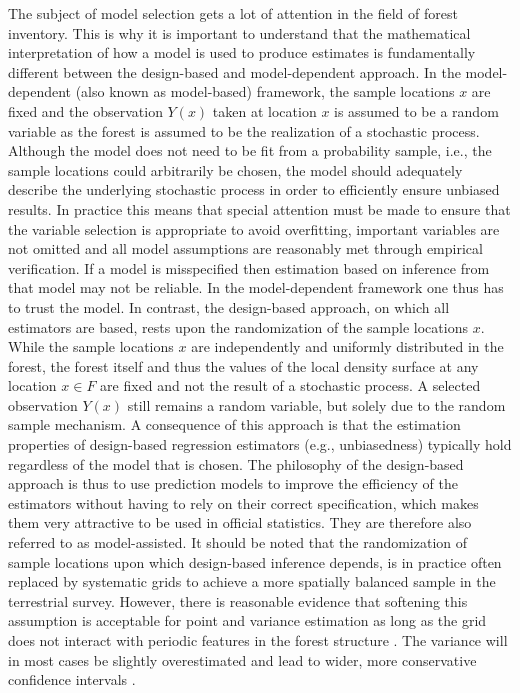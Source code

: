 \documentclass[article]{jss}
\begin{document}
The subject of model selection gets a lot of attention in the field of forest inventory. This is why it is important to understand that the mathematical interpretation of how a model is used to produce estimates is fundamentally different between the design-based and model-dependent approach. In the model-dependent (also known as model-based) framework, the sample locations $x$ are fixed and the observation $Y(x)$ taken at location $x$ is assumed to be a random variable as the forest is assumed to be the realization of a stochastic process. Although the model does not need to be fit from a probability sample, i.e., the sample locations could arbitrarily be chosen, the model should adequately describe the underlying stochastic process in order to efficiently ensure unbiased results. In practice this means that special attention must be made to ensure that the variable selection is appropriate to avoid overfitting, important variables are not omitted and all model assumptions are reasonably met through empirical verification. If a model is misspecified then estimation based on inference from that model may not be reliable. In the model-dependent framework one thus has to trust the model. In contrast, the design-based approach, on which all  estimators are based, rests upon the randomization of the sample locations $x$. While the sample locations $x$ are independently and uniformly distributed in the forest, the forest itself and thus the values of the local density surface at any location $x \in F$ are fixed and not the result of a stochastic process. A selected observation $Y(x)$ still remains a random variable, but solely due to the random sample mechanism. A consequence of this approach is that the estimation properties of design-based regression estimators (e.g., unbiasedness) typically hold regardless of the model that is chosen. The philosophy of the design-based approach is thus to use prediction models to improve the efficiency of the estimators without having to rely on their correct specification, which makes them very attractive to be used in official statistics. They are therefore also referred to as model-assisted. It should be noted that the randomization of sample locations upon which design-based inference depends, is in practice often replaced by systematic grids to achieve a more spatially balanced sample in the terrestrial survey. However, there is reasonable evidence that softening this assumption is acceptable for point and variance estimation as long as the grid does not interact with periodic features in the forest structure \citep{mandallaz2008}. The variance will in most cases be slightly overestimated and lead to wider, more conservative confidence intervals \citep{mandallaz2013a}.
\end{document}
